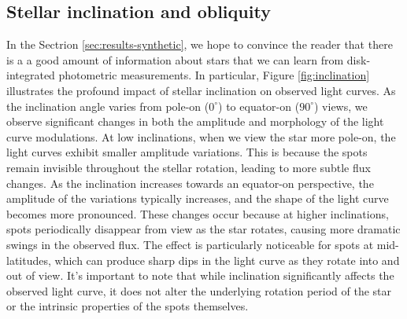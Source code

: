 \documentclass[twocolumn]{aastex631}
\begin{document}
\subsection{Stellar inclination and obliquity}
\label{sec:obl-inc}
In the Sectrion \ref{sec:results-synthetic}, we hope to convince the reader that there is a a good amount of information about stars that we can learn 
from disk-integrated photometric measurements. In particular, Figure \ref{fig:inclination} illustrates the profound impact of stellar inclination on observed light curves. 
As the inclination angle varies from pole-on ($0^\circ$) to equator-on ($90^\circ$) views, we observe significant changes in both the amplitude and 
morphology of the light curve modulations. At low inclinations, when we view the star more pole-on, the light curves exhibit smaller amplitude variations. 
This is because the spots remain invisible throughout the stellar rotation, leading to more subtle flux changes. As the inclination increases towards an 
equator-on perspective, the amplitude of the variations typically increases, and the shape of the light curve becomes more pronounced. These changes occur because 
at higher inclinations, spots periodically disappear from view as the star rotates, causing more dramatic swings in the observed flux. 
The effect is particularly noticeable for spots at mid-latitudes, which can produce sharp dips in the light curve as they rotate into and out of view. 
It's important to note that while inclination significantly affects the observed light curve, it does not alter the underlying rotation period of 
the star or the intrinsic properties of the spots themselves.
\end{document}
